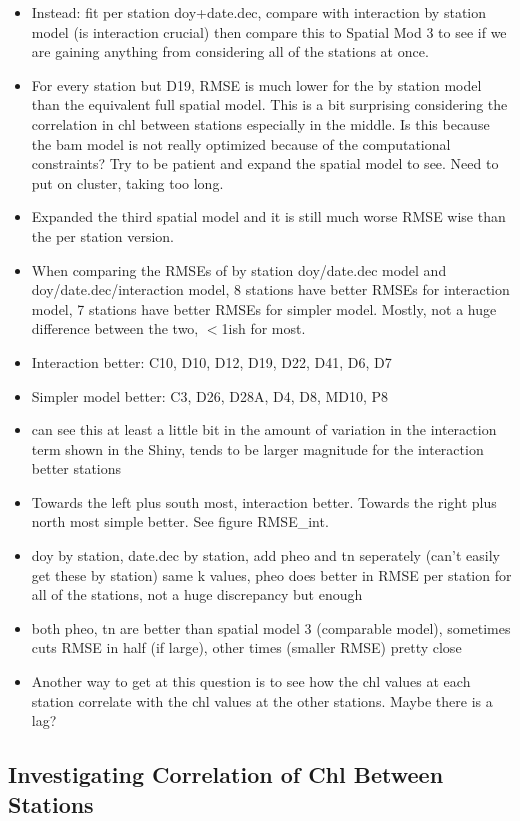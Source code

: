 \documentclass[12pt]{amsart}
\begin{document}
\begin{itemize}
\item Instead: fit per station doy+date.dec, compare with interaction by station model (is interaction crucial) then compare this to Spatial Mod 3 to see if we are gaining anything from considering all of the stations at once.
\item For every station but D19, RMSE is much lower for the by station model than the equivalent full spatial model. This is a bit surprising considering the correlation in chl between stations especially in the middle. Is this because the bam model is not really optimized because of the computational constraints? Try to be patient and expand the spatial model to see. Need to put on cluster, taking too long.
\item Expanded the third spatial model and it is still much worse RMSE wise than the per station version.
\item When comparing the RMSEs of by station doy/date.dec model and doy/date.dec/interaction model, 8 stations have better RMSEs for interaction model, 7 stations have better RMSEs for simpler model. Mostly, not a huge difference between the two, $<$1ish for most.
\item Interaction better: C10, D10, D12, D19, D22, D41, D6, D7
\item Simpler model better: C3, D26, D28A, D4, D8, MD10, P8
\item can see this at least a little bit in the amount of variation in the interaction term shown in the Shiny, tends to be larger magnitude for the interaction better stations
\item Towards the left plus south most, interaction better. Towards the right plus north most simple better. See figure RMSE_int.
\item doy by station, date.dec by station, add pheo and tn seperately (can't easily get these by station) same k values, pheo does better in RMSE per station for all of the stations, not a huge discrepancy but enough
\item both pheo, tn are better than spatial model 3 (comparable model), sometimes cuts RMSE in half (if large), other times (smaller RMSE) pretty close
\item Another way to get at this question is to see how the chl values at each station correlate with the chl values at the other stations. Maybe there is a lag?
\end{itemize}
\subsection{Investigating Correlation of Chl Between Stations}
\end{document}
